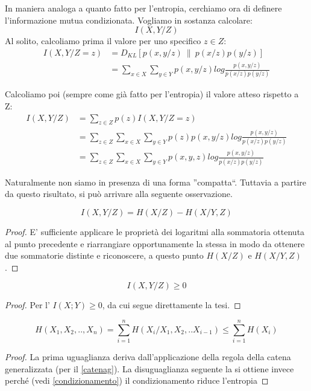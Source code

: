In maniera analoga a quanto fatto per l'entropia, cerchiamo ora di definere l'informazione mutua condizionata.
Vogliamo in sostanza calcolare:
\[
 I(X,Y/Z)
\]
Al solito, calcoliamo prima il valore per uno specifico $z \in Z$:
\[\begin{split}
 I(X,Y/Z=z)&=D_{KL}[p(x,y/z) \ \| \ p(x/z)p(y/z)] \\
 &=\sum_{x \in X} \sum_{y \in Y} p(x,y/z) log \frac{p(x,y/z)}{p(x/z)p(y/z)}
  \end{split}
\]

\noindent
Calcoliamo poi (sempre come già fatto per l'entropia) il valore atteso rispetto a Z:
\[
 \begin{split}
 I(X,Y/Z)&=\sum_{z \in Z} p(z) I(X,Y/Z=z) \\
 &=\sum_{z \in Z} \sum_{x \in X} \sum_{y \in Y} p(z)p(x,y/z) log \frac{p(x,y/z)}{p(x/z)p(y/z)} \\
 &=\sum_{z \in Z} \sum_{x \in X} \sum_{y \in Y} p(x,y,z) log \frac{p(x,y/z)}{p(x/z)p(y/z)}
  \end{split}
\]

\bigskip
\noindent
Naturalmente non siamo in presenza di una forma ''compatta``. Tuttavia a partire da questo risultato, 
si può arrivare alla seguente osservazione.

\begin{osservazione}
 \[
 I(X,Y/Z)=H(X/Z)-H(X/Y,Z)
\]
 \begin{proof}
E' sufficiente applicare le proprietà dei logaritmi alla sommatoria ottenuta al punto precedente e riarrangiare 
opportunamente la stessa in modo da ottenere due sommatorie distinte e riconoscere, a questo punto $H(X/Z)$ e $H(X/Y,Z)$.
\end{proof}
\end{osservazione}

\begin{osservazione}
 \[
  I(X,Y/Z) \ge 0
 \]
 \begin{proof}
 Per l'\label{distinf} $I(X; Y) \ge 0$, da cui segue direttamente la tesi.
 \end{proof}
\end{osservazione}

\begin{osservazione}
\[
 H(X_1,X_2,..,X_n)=\sum_{i=1}^n H(X_i/X_1,X_2,..X_{i-1}) \le \sum_{i=1}^n H(X_i)
\]
 \begin{proof}
 La prima uguaglianza deriva dall'applicazione della regola della catena generalizzata (per il \ref{catenag}). La 
 disuguaglianza seguente la si ottiene invece perché (vedi \ref{condizionamento}) il condizionamento riduce l'entropia
 \end{proof}
\end{osservazione}

